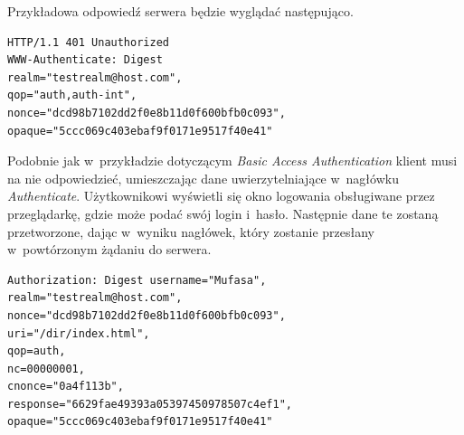 \documentclass[11pt]{aghdpl}
\begin{document}
Przykładowa odpowiedź serwera będzie wyglądać następująco.
\begin{lstlisting}
HTTP/1.1 401 Unauthorized
WWW-Authenticate: Digest
realm="testrealm@host.com",
qop="auth,auth-int",
nonce="dcd98b7102dd2f0e8b11d0f600bfb0c093",
opaque="5ccc069c403ebaf9f0171e9517f40e41"
\end{lstlisting}

Podobnie jak w~przykładzie dotyczącym \emph{Basic Access Authentication} klient musi na nie odpowiedzieć, umieszczając dane uwierzytelniające w~nagłówku \emph{Authenticate}. Użytkownikowi wyświetli się okno logowania obsługiwane przez przeglądarkę, gdzie może podać swój login i~hasło. Następnie dane te zostaną przetworzone, dając w~wyniku nagłówek, który zostanie przesłany w~powtórzonym żądaniu do serwera.
\begin{lstlisting}
Authorization: Digest username="Mufasa",
realm="testrealm@host.com",
nonce="dcd98b7102dd2f0e8b11d0f600bfb0c093",
uri="/dir/index.html",
qop=auth,
nc=00000001,
cnonce="0a4f113b",
response="6629fae49393a05397450978507c4ef1",
opaque="5ccc069c403ebaf9f0171e9517f40e41"
\end{lstlisting}
\end{document}
